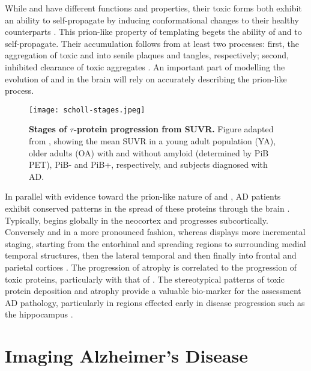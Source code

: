 While \AB and \TP have different functions and properties, their toxic forms
both exhibit an ability to self-propagate by inducing conformational changes to
their healthy counterparts \cite{prusiner1991, prusiner1998,
walker2015neurodegenerative}. This prion-like property of templating begets the
ability of \AB and \TP to self-propagate. Their accumulation follows from at
least two processes: first, the aggregation of toxic \AB and \TP into senile 
plaques and tangles, respectively;
second, inhibited clearance of toxic aggregates
\cite{duyckaerts2009classification,tarasoff2015clearance}. An important part of 
modelling the evolution of \AB and \TP in the brain will rely on accurately 
describing the prion-like process.

\begin{figure}[t]
    \texttt{[image: scholl-stages.jpeg]}
    \centering
    \caption{\textbf{Stages of $\tau$-protein progression from SUVR.} 
    Figure adapted from \cite{SCHOLL2016971}, showing the mean \TP
    SUVR in a young adult population (YA), older adults (OA) with and without
    amyloid (determined by PiB PET), PiB- and PiB+, respectively, and subjects
    diagnosed with AD.}
    \label{fig:taustaging}
\end{figure}

In parallel with evidence toward the prion-like nature of \AB and \TP, AD
patients exhibit conserved patterns in the spread of these proteins through the
brain \cite{braak1991neuropathological, grothe2031, SCHOLL2016971,cho2016vivo}.
Typically, \AB begins globally in the neocortex and progresses subcortically.
Conversely and in a more pronounced fashion, whereas \TP displays more
incremental staging, starting from the entorhinal and spreading regions to
surrounding medial temporal structures, then the lateral temporal and then
finally into frontal and parietal cortices \cite{lowe2016,
SCHOLL2016971,Ossenkoppele2016, cho2016vivo}. The progression of atrophy is
correlated to the progression of toxic proteins, particularly with that of \TP
\cite{harrison2019longitudinal, xia2017association, cho2016vivo, jack2018nia,
pini2016}. The stereotypical patterns of toxic protein deposition and atrophy
provide a valuable bio-marker for the assessment AD pathology, particularly in
regions effected early in disease progression such as the hippocampus
\cite{echavarri2011atrophy, jack2011steps, eskildsen2015structural}.

\section{Imaging Alzheimer's Disease}\label{sec:1-imaging}

